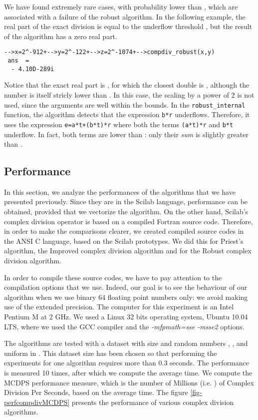 \documentclass{paper}
\newcommand{\scifun}[1]{\texttt{#1}}
\newcommand{\scivar}[1]{\texttt{#1}}
\begin{document}
We have found extremely rare cases, with probability lower than , 
which are associated with a failure of the robust algorithm. 
In the following example, the real part of the exact division is 
equal to the underflow threshold , but the result of the 
algorithm has a zero real part.
\lstset{language=scilabscript}
\begin{lstlisting}
-->x=2^-912+-->y=2^-122+-->z=2^-1074+-->compdiv_robust(x,y)
 ans  =
  - 4.10D-289i  
\end{lstlisting}
Notice that the exact real part is , 
for which the closest double is , although the number is itself 
stricly lower than .
In this case, the scaling by a power of 2 is not used, since the 
arguments are well within the bounds. 
In the \scifun{robust\_internal} function, the algorithm detects that the 
expression \scivar{b*r} underflows. 
Therefore, it uses the expression \scivar{e=a*t+(b*t)*r} where both 
the terms \scivar{(a*t)*r} and \scivar{b*t} underflow. 
In fact, both terms are lower than : 
only their \emph{sum} is slightly greater than .


\subsection{Performance}

In this section, we analyze the performances of the algorithms that we have 
presented previously.
Since they are in the Scilab language, performance can be obtained, provided that 
we vectorize the algorithm. 
On the other hand, Scilab's complex division operator is based on a compiled 
Fortran source code. 
Therefore, in order to make the comparisons clearer, we created compiled source codes in 
the ANSI C language, based on the Scilab prototypes. 
We did this for Priest's algorithm, the Improved complex division algorithm and for 
the Robust complex division algorithm.

In order to compile these source codes, we have to pay attention to the 
compilation options that we use. 
Indeed, our goal is to see the behaviour of our algorithm when we 
use binary 64 floating point numbers only: we avoid making use of the extended precision. 
The computer for this experiment is an Intel Pentium M at 2 GHz. 
We used a Linux 32 bits operating system, Ubuntu 10.04 LTS, 
where we used the GCC compiler and the \emph{-mfpmath=sse -msse2} options. 

The algorithms are tested with a dataset with size  and 
random numbers , ,  and  uniform in . 
This dataset size has been chosen so that performing the  experiments for 
one algorithm requires more than 0.3 seconds. 
The performance is measured 10 times, after which we compute the 
average time.
We compute the MCDPS performance measure, which is the number of 
Millions (i.e. ) of Complex Division Per Seconds, 
based on the average time.
The figure \ref{fig-perfcompdivMCDPS} presents the performance of 
various complex division algorithms.
\end{document}
